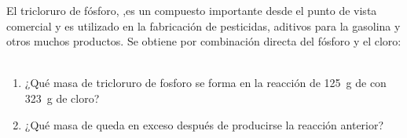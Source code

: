 El tricloruro de fósforo, ,es un compuesto importante desde el punto de vista comercial y es utilizado en la fabricación de pesticidas, aditivos para la gasolina y otros muchos productos. Se obtiene por combinación directa del fósforo y el cloro:\\
    \\
\begin{enumerate}[label={\alph*)},font={\color{red!50!black}\bfseries}]
	\item ¿Qué masa de tricloruro de fosforo se forma en la reacción de \SI{125}{\gram} de  con \SI{323}{\gram} de cloro?
	\item ¿Qué masa de  queda en exceso después de producirse la reacción anterior?
\end{enumerate}
